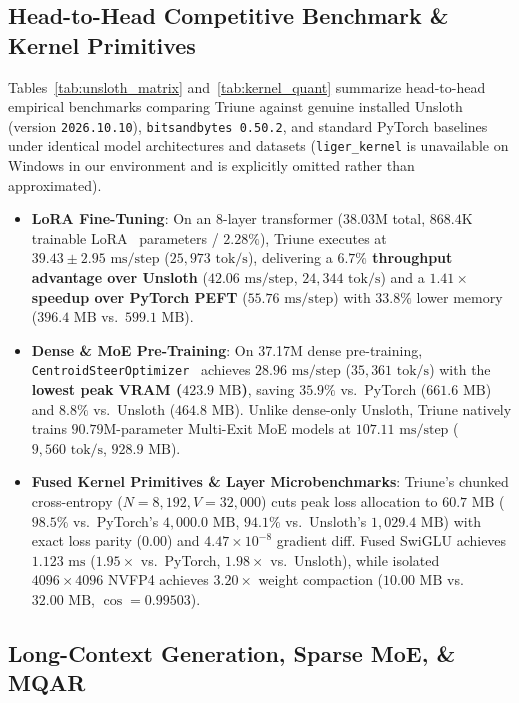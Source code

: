 \documentclass[10pt,twocolumn,letterpaper]{article}
\begin{document}
\subsection{Head-to-Head Competitive Benchmark \& Kernel Primitives}

Tables~\ref{tab:unsloth_matrix} and~\ref{tab:kernel_quant} summarize head-to-head empirical benchmarks comparing Triune against genuine installed Unsloth (version \texttt{2026.10.10}), \texttt{bitsandbytes 0.50.2}, and standard PyTorch baselines under identical model architectures and datasets (\texttt{liger\_kernel} is unavailable on Windows in our environment and is explicitly omitted rather than approximated).
\begin{itemize}
    \item \textbf{LoRA Fine-Tuning}: On an 8-layer transformer ($38.03\text{M}$ total, $868.4\text{K}$ trainable LoRA~\cite{hu2022lora} parameters / $2.28\%$), Triune executes at $39.43 \pm 2.95\text{ ms/step}$ ($25,973\text{ tok/s}$), delivering a \textbf{$6.7\%$ throughput advantage over Unsloth} ($42.06\text{ ms/step}$, $24,344\text{ tok/s}$) and a \textbf{$1.41\times$ speedup over PyTorch PEFT} ($55.76\text{ ms/step}$) with $33.8\%$ lower memory ($396.4\text{ MB}$ vs.\ $599.1\text{ MB}$).
    \item \textbf{Dense \& MoE Pre-Training}: On 37.17M dense pre-training, \texttt{CentroidSteerOptimizer}~\cite{bhardwaj2026centroidsteer} achieves $28.96\text{ ms/step}$ ($35,361\text{ tok/s}$) with the \textbf{lowest peak VRAM ($423.9\text{ MB}$)}, saving $35.9\%$ vs.\ PyTorch ($661.6\text{ MB}$) and $8.8\%$ vs.\ Unsloth ($464.8\text{ MB}$). Unlike dense-only Unsloth, Triune natively trains $90.79\text{M}$-parameter Multi-Exit MoE models at $107.11\text{ ms/step}$ ($9,560\text{ tok/s}$, $928.9\text{ MB}$).
    \item \textbf{Fused Kernel Primitives \& Layer Microbenchmarks}: Triune's chunked cross-entropy ($N=8,192, V=32,000$) cuts peak loss allocation to $60.7\text{ MB}$ ($98.5\%$ vs.\ PyTorch's $4,000.0\text{ MB}$, $94.1\%$ vs.\ Unsloth's $1,029.4\text{ MB}$) with exact loss parity ($0.00$) and $4.47 \times 10^{-8}$ gradient diff. Fused SwiGLU achieves $1.123\text{ ms}$ ($1.95\times$ vs.\ PyTorch, $1.98\times$ vs.\ Unsloth), while isolated $4096 \times 4096$ NVFP4 achieves $3.20\times$ weight compaction ($10.00\text{ MB}$ vs.\ $32.00\text{ MB}$, $\cos = 0.99503$).
\end{itemize}

\subsection{Long-Context Generation, Sparse MoE, \& MQAR}
\end{document}
